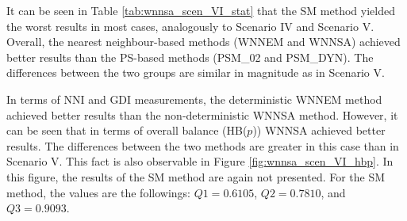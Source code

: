 		\begin{table}[h]
			\caption{Quality measures for Scenario VI. %
			}
			\label{tab:wnnsa_scen_VI_stat}
			\centering
		\end{table}
										
		It can be seen in Table \ref{tab:wnnsa_scen_VI_stat} that the SM method yielded the worst results in most cases, analogously to Scenario IV and Scenario V. Overall, the nearest neighbour-based methods (WNNEM and WNNSA) achieved better results than the PS-based methods (PSM\_02 and PSM\_DYN). The differences between the two groups are similar in magnitude as in Scenario V.
										
		In terms of NNI and GDI measurements, the deterministic WNNEM method achieved better results than the non-deterministic WNNSA method. However, it can be seen that in terms of overall balance (HB($p$)) WNNSA achieved better results. The differences between the two methods are greater in this case than in Scenario V. This fact is also observable in Figure \ref{fig:wnnsa_scen_VI_hbp}. In this figure, the results of the SM method are again not presented. For the SM method, the values are the followings: $Q1=0.6105$, $Q2=0.7810$, and $Q3=0.9093$.
										
